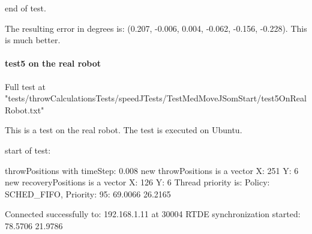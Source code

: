 end of test.\newline 

The resulting error in degrees is: (0.207, -0.006, 0.004, -0.062, -0.156, -0.228). This is much better.

\paragraph{test5 on the real robot}
Full test at "tests/throwCalculationsTests/speedJTests/TestMedMoveJSomStart/test5OnRealRobot.txt"

This is a test on the real robot. The test is executed on Ubuntu.

start of test: \newline 

throwPositions with timeStep:  0.008\newline 
new throwPositions is a vector X: 251 Y:  6\newline 
new recoveryPositions is a vector X: 126 Y:  6\newline 
Thread priority is: \newline 
Policy: SCHED\_FIFO, Priority: 95: 69.0066 26.2165\newline 

Connected successfully to: 192.168.1.11 at 30004\newline 
RTDE synchronization started: 78.5706 21.9786\newline 

